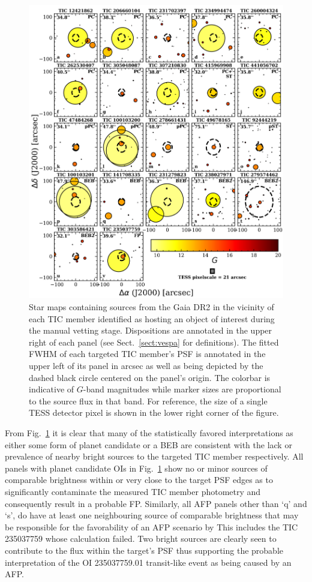 \begin{figure}
  \centering
  \includegraphics[width=0.8\hsize]{figures/GAIAFPs.png}
  \caption[Gaia sources around TICs with \texttt{ORION} planet candidates.]
          {Star maps containing sources from the Gaia DR2 in the vicinity of each TIC member identified
    as hosting an object of interest during the manual vetting stage. 
    Dispositions are annotated in the upper right of each panel (see Sect.~\ref{sect:vespa} for
    definitions). The fitted FWHM of each targeted TIC member's PSF is annotated in the upper left
    of its panel in arcsec as well as being depicted by the dashed black circle centered on the
    panel's origin. The colorbar is indicative of $G$-band magnitudes while marker sizes are proportional
    to the source flux in that band. For reference, the size of a single TESS detector pixel is shown
    in the lower right corner of the figure.}
  \label{fig:gaiafps}
\end{figure}

From Fig.~\ref{fig:gaiafps} it is clear that many of the statistically favored interpretations as either 
some form of planet candidate or a BEB are consistent with the lack or prevalence of nearby bright sources
to the targeted TIC member respectively.
All panels with planet candidate OIs in Fig.~\ref{fig:gaiafps} show no
or minor sources of comparable brightness within or very close to the target PSF edges as to significantly
contaminate the measured TIC member photometry and consequently result in a probable FP.
Similarly, all AFP panels other than `q' and `s',
do have at least one neighbouring source of comparable brightness that may be responsible
for the favorability of an AFP scenario by 
This includes the TIC 235037759 whose \vespa{} calculation failed.
Two bright sources are clearly seen to contribute to the flux within the target's PSF thus supporting the
probable interpretation of the OI 235037759.01 transit-like event as being caused by an AFP. \\

